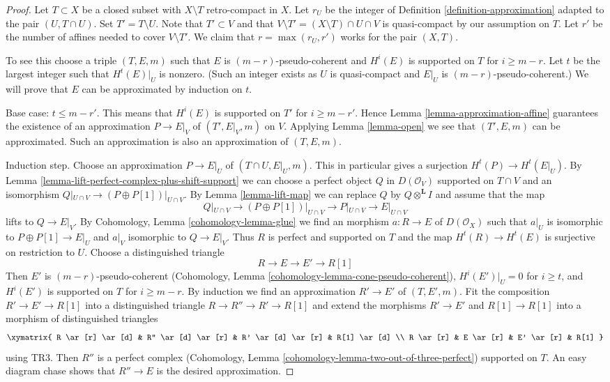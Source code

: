 \documentclass{stacks-project}
\theoremstyle{plain}
\theoremstyle{definition}
\theoremstyle{remark}
\numberwithin{equation}{subsection}
\begin{document}
\begin{proof}
Let $T \subset X$ be a closed subset with $X \setminus T$ retro-compact
in $X$. Let $r_U$ be the integer of Definition \ref{definition-approximation}
adapted to the pair $(U, T \cap U)$.
Set $T' = T \setminus U$. Note that
$T' \subset V$ and that $V \setminus T' = (X \setminus T) \cap U \cap V$
is quasi-compact by our assumption on $T$.
Let $r'$ be the number of affines needed to cover $V \setminus T'$.
We claim that $r = \max(r_U, r')$ works for the pair $(X, T)$.

\medskip\noindent
To see this choose a triple $(T, E, m)$ such that $E$ is
$(m - r)$-pseudo-coherent and $H^i(E)$ is supported on $T$ for
$i \geq m - r$. Let $t$ be the largest integer such that
$H^t(E)|_U$ is nonzero. (Such an integer exists as $U$ is quasi-compact
and $E|_U$ is $(m - r)$-pseudo-coherent.)
We will prove that $E$ can be approximated by induction on $t$.

\medskip\noindent
Base case: $t \leq m - r'$. This means that $H^i(E)$ is supported
on $T'$ for $i \geq m - r'$. Hence
Lemma \ref{lemma-approximation-affine}
guarantees the existence of an approximation
$P \to E|_V$ of $(T', E|_V, m)$ on $V$.
Applying Lemma \ref{lemma-open} we see that
$(T', E, m)$ can be approximated. Such an approximation
is also an approximation of $(T, E, m)$.

\medskip\noindent
Induction step. Choose an approximation $P \to E|_U$
of $(T \cap U, E|_U, m)$. This in particular gives a surjection
$H^t(P) \to H^t(E|_U)$. By
Lemma \ref{lemma-lift-perfect-complex-plus-shift-support}
we can choose a perfect object $Q$ in $D(\mathcal{O}_V)$
supported on $T \cap V$ and an isomorphism
$Q|_{U \cap V} \to (P \oplus P[1])|_{U \cap V}$.
By Lemma \ref{lemma-lift-map} we can replace $Q$ by
$Q \otimes^\mathbf{L} I$
and assume that the map
$$
Q|_{U \cap V} \to (P \oplus P[1])|_{U \cap V}
\longrightarrow P|_{U \cap V}
\longrightarrow
E|_{U \cap V}
$$
lifts to $Q \to E|_V$. By
Cohomology, Lemma \ref{cohomology-lemma-glue}
we find an morphism $a : R \to E$ of $D(\mathcal{O}_X)$
such that $a|_U$ is isomorphic to $P \oplus P[1] \to E|_U$
and $a|_V$ isomorphic to $Q \to E|_V$.
Thus $R$ is perfect and supported on $T$
and the map $H^t(R) \to H^t(E)$ is surjective on restriction to $U$.
Choose a distinguished triangle
$$
R \to E \to E' \to R[1]
$$
Then $E'$ is $(m - r)$-pseudo-coherent
(Cohomology, Lemma \ref{cohomology-lemma-cone-pseudo-coherent}),
$H^i(E')|_U = 0$ for $i \geq t$, and
$H^i(E')$ is supported on $T$ for $i \geq m - r$.
By induction we find an approximation $R' \to E'$
of $(T, E', m)$. Fit the composition $R' \to E' \to R[1]$
into a distinguished triangle $R \to R'' \to R' \to R[1]$
and extend the morphisms $R' \to E'$ and $R[1] \to R[1]$ into
a morphism of distinguished triangles
$$
\xymatrix{
R \ar[r] \ar[d] & R'' \ar[d] \ar[r] & R' \ar[d] \ar[r] & R[1] \ar[d] \\
R \ar[r] &  E \ar[r] & E' \ar[r] & R[1]
}
$$
using TR3. Then $R''$ is a perfect complex
(Cohomology, Lemma \ref{cohomology-lemma-two-out-of-three-perfect})
supported on $T$.
An easy diagram chase shows that $R'' \to E$ is the desired
approximation.
\end{proof}
\end{document}
